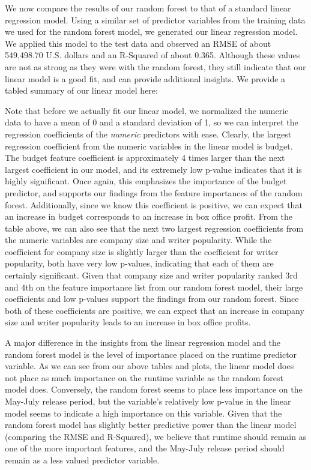 \documentclass[10pt]{article}
\begin{document}
We now compare the results of our random forest to that of a standard linear regression model. Using a similar set of predictor variables from the training data we used for the random forest model, we generated our linear regression model. We applied this model to the test data and observed an RMSE of about 549,498.70 U.S. dollars and an R-Squared of about 0.365. Although these values are not as strong as they were with the random forest, they still indicate that our linear model is a good fit, and can provide additional insights. We provide a tabled summary of our linear model here:



Note that before we actually fit our linear model, we normalized the numeric data to have a mean of 0 and a standard deviation of 1, so we can interpret the regression coefficients of the \textit{numeric} predictors with ease. Clearly, the largest regression coefficient from the numeric variables in the linear model is budget. The budget feature coefficient is approximately 4 times larger than the next largest coefficient in our model, and its extremely low p-value indicates that it is highly significant. Once again, this emphasizes the importance of the budget predictor, and supports our findings from the feature importances of the random forest. Additionally, since we know this coefficient is positive, we can expect that an increase in budget corresponds to an increase in box office profit. From the table above, we can also see that the next two largest regression coefficients from the numeric variables are company size and writer popularity. While the coefficient for company size is slightly larger than the coefficient for writer popularity, both have very low p-values, indicating that each of them are certainly significant. Given that company size and writer popularity ranked 3rd and 4th on the feature importance list from our random forest model, their large coefficients and low p-values support the findings from our random forest. Since both of these coefficients are positive, we can expect that an increase in company size and writer popularity leads to an increase in box office profits. 

A major difference in the insights from the linear regression model and the random forest model is the level of importance placed on the runtime predictor variable. As we can see from our above tables and plots, the linear model does not place as much importance on the runtime variable as the random forest model does. Conversely, the random forest seems to place less importance on the May-July release period, but the variable’s relatively low p-value in the linear model seems to indicate a high importance on this variable. Given that the random forest model has slightly better predictive power than the linear model (comparing the RMSE and R-Squared), we believe that runtime should remain as one of the more important features, and the May-July release period should remain as a less valued predictor variable. 
\end{document}
